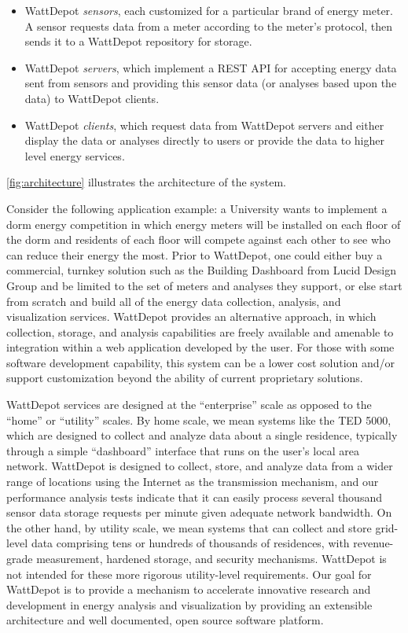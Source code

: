 \documentclass[conference]{IEEEtran}
\begin{document}
\begin{itemize}
\item WattDepot {\em sensors}, each customized for a particular brand of
energy meter.  A sensor requests data from a meter according to the meter's
protocol, then sends it to a WattDepot repository for storage.

\item WattDepot {\em servers}, which implement a REST \cite{REST} API
for accepting energy data sent from sensors and providing this sensor data
(or analyses based upon the data) to WattDepot clients.

\item WattDepot {\em clients}, which request data from WattDepot
servers and either display the data or analyses directly to users or
provide the data to higher level energy services.
\end{itemize}

\figurename \ref{fig:architecture} illustrates the architecture of the system.


Consider the following application example: a University wants to implement
a dorm energy competition in which energy meters will be installed on each
floor of the dorm and residents of each floor will compete against each other
to see who can reduce their energy the most.  Prior to WattDepot, one could
either buy a commercial, turnkey solution such as the Building Dashboard
from Lucid Design Group and be limited to the set of meters and analyses they
support, or else start from scratch and build all of the energy data
collection, analysis, and visualization services.  WattDepot provides an
alternative approach, in which collection, storage, and analysis
capabilities are freely available and amenable to integration within a web
application developed by the user.  For those with some software
development capability, this system can be a lower cost solution and/or support
customization beyond the ability of current proprietary solutions.

WattDepot services are designed at the ``enterprise'' scale as opposed to
the ``home'' or ``utility'' scales.  By home scale, we mean systems like
the TED 5000, which are designed to collect and analyze data about a single
residence, typically through a simple ``dashboard'' interface that runs on
the user's local area network.  WattDepot is designed to
collect, store, and analyze data from a wider range of locations using the
Internet as the transmission mechanism, and our performance analysis tests
indicate that it can easily process several thousand sensor data storage
requests per minute given adequate network bandwidth.  On the other hand,
by utility scale, we mean systems that can collect and store grid-level
data comprising tens or hundreds of thousands of residences, with
revenue-grade measurement, hardened storage, and security mechanisms.
WattDepot is not intended for these more rigorous utility-level
requirements.  Our goal for WattDepot is to provide a mechanism to
accelerate innovative research and development in energy analysis and
visualization by providing an extensible architecture and well documented,
open source software platform.
\end{document}
